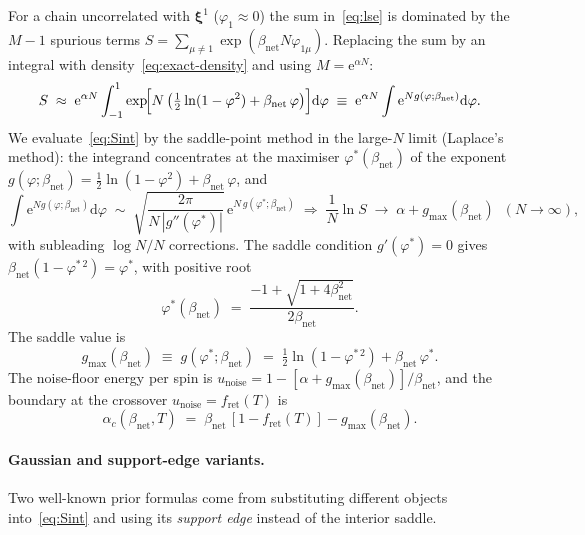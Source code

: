 \documentclass[11pt]{article}
\newcommand{\bxi}{\boldsymbol{\xi}}
\newcommand{\e}{{\mathrm{e}}}
\newcommand{\dd}{{\mathrm{d}}}
\newcommand{\Bnet}{\beta_{\mathrm{net}}}
\newcommand{\fret}{f_{\mathrm{ret}}}
\newcommand{\gmax}{g_{\max}}
\begin{document}
For a chain uncorrelated with $\bxi^1$ ($\varphi_1 \approx 0$) the sum
in~\eqref{eq:lse} is dominated by the $M-1$ spurious terms
$S = \sum_{\mu \neq 1} \exp(\Bnet N \varphi_{1\mu})$.  Replacing the sum
by an integral with density~\eqref{eq:exact-density} and using
$M = \e^{\alpha N}$:
\begin{equation}
S \;\approx\; \e^{\alpha N} \int_{-1}^{1}
   \exp\!\Bigl[N\,\bigl(\tfrac12 \ln(1 - \varphi^2)
                        + \Bnet\,\varphi\bigr)\Bigr] \dd\varphi
\;\equiv\; \e^{\alpha N} \int \e^{N g(\varphi;\Bnet)} \dd\varphi.
\label{eq:Sint}
\end{equation}
We evaluate~\eqref{eq:Sint} by the saddle-point method in the large-$N$
limit (Laplace's method): the integrand concentrates at the maximiser
$\varphi^{*}(\Bnet)$ of the exponent
$g(\varphi; \Bnet) = \tfrac12 \ln(1 - \varphi^2) + \Bnet\,\varphi$, and
\begin{equation}
\int \e^{N g(\varphi; \Bnet)} \dd\varphi
   \;\sim\; \sqrt{\frac{2\pi}{N\,|g''(\varphi^{*})|}}\,
            \e^{N\,g(\varphi^{*}; \Bnet)}
\;\Longrightarrow\;
\frac{1}{N} \ln S \;\to\; \alpha + \gmax(\Bnet)
\;\;(N \to \infty),
\label{eq:saddle-method}
\end{equation}
with subleading $\log N / N$ corrections.  The saddle condition
$g'(\varphi^{*}) = 0$ gives $\Bnet(1 - \varphi^{*\,2}) = \varphi^{*}$,
with positive root
\begin{equation}
\varphi^{*}(\Bnet) \;=\; \frac{-1 + \sqrt{1 + 4 \Bnet^2}}{2 \Bnet}.
\label{eq:phistar}
\end{equation}
The saddle value is
\begin{equation}
\gmax(\Bnet) \;\equiv\; g(\varphi^{*}; \Bnet)
   \;=\; \tfrac12 \ln(1 - \varphi^{*\,2}) + \Bnet\,\varphi^{*}.
\label{eq:gmax}
\end{equation}
The noise-floor energy
per spin is $u_{\mathrm{noise}} = 1 - [\alpha + \gmax(\Bnet)]/\Bnet$,
and the boundary at the crossover $u_{\mathrm{noise}} = \fret(T)$ is
\begin{equation}
\boxed{\;
\alpha_c(\Bnet, T) \;=\; \Bnet\,[1 - \fret(T)] - \gmax(\Bnet).
\;}
\label{eq:acsd}
\end{equation}

\paragraph{Gaussian and support-edge variants.}
Two well-known prior formulas come from substituting different objects
into~\eqref{eq:Sint} and using its \emph{support edge} instead of the
interior saddle.
\end{document}
